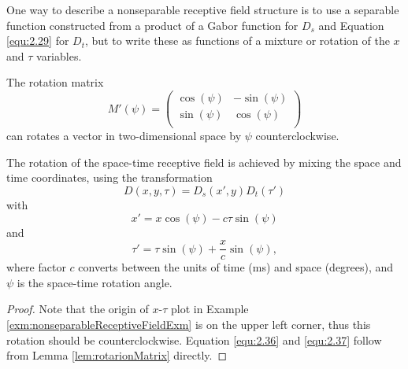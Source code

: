 \begin{rem}
  One way to describe a nonseparable receptive field structure is to use a separable function constructed from a product of a Gabor function for $D_s$ and Equation \ref{equ:2.29} for $D_t$, but to write these as functions of a mixture or rotation of the $x$ and $\tau$ variables.
\end{rem}

\begin{lem}
  \label{lem:rotarionMatrix}
  The rotation matrix
  \begin{equation}
    \label{equ:rotationMatrix}
    M'(\psi) = \left(
      \begin{matrix}
        \cos(\psi) & -\sin(\psi) \\
        \sin(\psi) & \cos(\psi) \\
      \end{matrix}
    \right)
  \end{equation}
  can rotates a vector in two-dimensional space by $\psi$ counterclockwise.
\end{lem}

\begin{prop}
  The rotation of the space-time receptive field is achieved by mixing the space and time coordinates, using the transformation
  \begin{equation}
    \label{equ:2.35}
    D(x,y,\tau) = D_s(x',y)D_t(\tau')
  \end{equation}
  with
  \begin{equation}
    \label{equ:2.36}
    x' = x\cos(\psi) - c\tau\sin(\psi)
  \end{equation}
  and
  \begin{equation}
    \label{equ:2.37}
    \tau' = \tau\sin(\psi) + \frac{x}{c}\sin(\psi),
  \end{equation}
  where factor $c$ converts between the units of time (ms) and space (degrees), and $\psi$ is the space-time rotation angle.
\end{prop}
\begin{proof}
  Note that the origin of $x$-$\tau$ plot in Example \ref{exm:nonseparableReceptiveFieldExm} is on the upper left corner, thus this rotation should be counterclockwise. Equation \ref{equ:2.36} and \ref{equ:2.37} follow from Lemma \ref{lem:rotarionMatrix} directly.
\end{proof}

